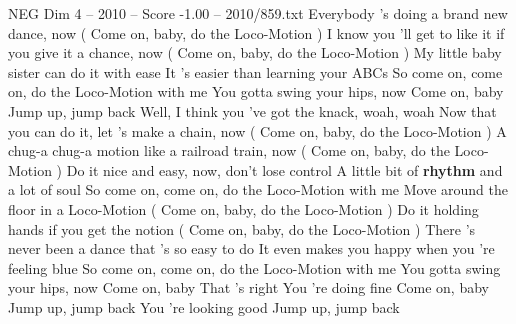 \begin{textsample}{NEG Dim 4 – 2010 – Score -1.00 – 2010/859.txt}  \label{ex:f4_neg_006}
Everybody 's doing a brand new dance, now ( Come on, baby, do the Loco-Motion ) I know you 'll get to like it if you give it a chance, now ( Come on, baby, do the Loco-Motion ) My little baby sister can do it with ease It 's easier than learning your ABCs So come on, come on, do the Loco-Motion with me You gotta swing your hips, now Come on, baby Jump up, jump back Well, I think you 've got the knack, woah, woah Now that you can do it, let 's make a chain, now ( Come on, baby, do the Loco-Motion ) A chug-a chug-a motion like a railroad train, now ( Come on, baby, do the Loco-Motion ) Do it nice and easy, now, don't lose control A little bit of \textbf{rhythm} and a lot of soul So come on, come on, do the Loco-Motion with me Move around the floor in a Loco-Motion ( Come on, baby, do the Loco-Motion ) Do it holding hands if you get the notion ( Come on, baby, do the Loco-Motion ) There 's never been a dance that 's so easy to do It even makes you happy when you 're feeling blue So come on, come on, do the Loco-Motion with me You gotta swing your hips, now Come on, baby That 's right You 're doing fine Come on, baby Jump up, jump back You 're looking good Jump up, jump back

\end{textsample}

